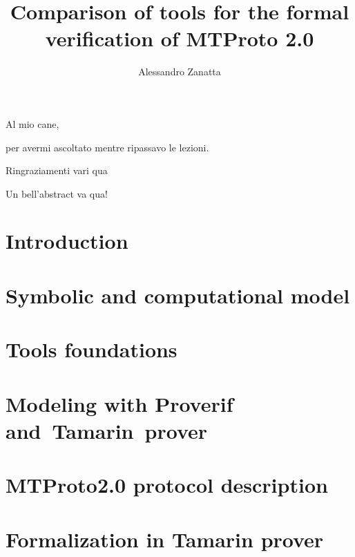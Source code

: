 \documentclass[target=bach,aauheader=]{thud}
\title{Comparison of tools for the formal verification of MTProto 2.0}
\author{Alessandro Zanatta}
\begin{document}
\maketitle

\begin{dedication}
  Al mio cane,\par per avermi ascoltato mentre ripassavo le lezioni.
\end{dedication}

\acknowledgements
Ringraziamenti vari qua

\abstract
Un bell'abstract va qua!

\tableofcontents



\mainmatter

\chapter{Introduction}


\chapter{Symbolic and computational model}


\chapter{Tools foundations}


\chapter{Modeling with Proverif and~Tamarin~prover}


\chapter{MTProto2.0 protocol description}


\chapter{Formalization in Tamarin prover}

\end{document}
